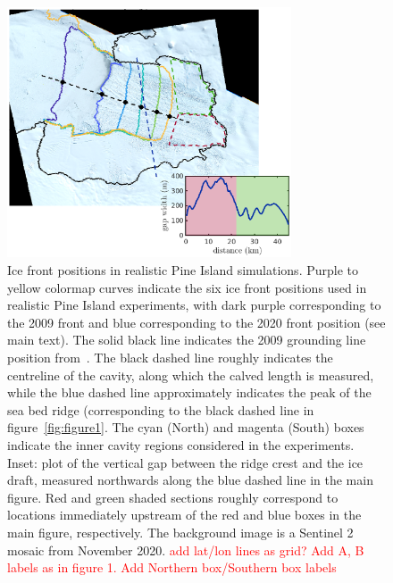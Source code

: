 \documentclass[draft]{agujournal2019}
\newcommand{\red}[1]{\textcolor{red}{#1}}
\begin{document}
\begin{figure}
    \centering
    \includegraphics[width = 0.75\textwidth]{../make_figures/plots/figure10.eps}
    \caption{Ice front positions in realistic Pine Island simulations. Purple to yellow colormap curves indicate the six ice front positions used in realistic Pine Island experiments, with dark purple corresponding to the 2009 front and blue corresponding to the 2020 front position (see main text). The solid black line indicates the 2009 grounding line position from~\cite{Joughin2010GRL}. The black dashed line roughly indicates the centreline of the cavity, along which the calved length is measured, while the blue dashed line approximately indicates  the peak of the sea bed ridge (corresponding to the black dashed line in figure~\ref{fig:figure1}. The cyan (North) and magenta (South) boxes indicate the inner cavity regions considered in the experiments. Inset: plot of the vertical gap between the ridge crest and the ice draft, measured northwards along the blue dashed line in the main figure. Red and green shaded sections roughly correspond to locations immediately upstream of the red and blue boxes in the main figure, respectively. The background image is a Sentinel 2 mosaic from November 2020. \red{add lat/lon lines as grid? Add A, B labels as in figure 1. Add Northern box/Southern box labels}}
    \label{fig:figure10}
\end{figure}

\end{document}
